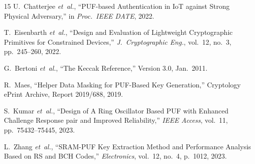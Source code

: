 \documentclass[conference]{IEEEtran}
\begin{document}
\begin{thebibliography}{15}
U.~Chatterjee \emph{et~al.}, ``PUF-based Authentication in IoT against Strong Physical Adversary,'' in \emph{Proc.\ IEEE DATE}, 2022.

T.~Eisenbarth \emph{et~al.}, ``Design and Evaluation of Lightweight Cryptographic Primitives for Constrained Devices,'' \emph{J.\ Cryptographic Eng.}, vol.~12, no.~3, pp.~245--260, 2022.

G.~Bertoni \emph{et~al.}, ``The Keccak Reference,'' Version 3.0, Jan.~2011.

R.~Maes, ``Helper Data Masking for PUF-Based Key Generation,'' Cryptology ePrint Archive, Report 2019/688, 2019.

S.~Kumar \emph{et~al.}, ``Design of A Ring Oscillator Based PUF with Enhanced Challenge Response pair and Improved Reliability,'' \emph{IEEE Access}, vol.~11, pp.~75432--75445, 2023.

L.~Zhang \emph{et~al.}, ``SRAM-PUF Key Extraction Method and Performance Analysis Based on RS and BCH Codes,'' \emph{Electronics}, vol.~12, no.~4, p.~1012, 2023.

\end{thebibliography}
\end{document}
